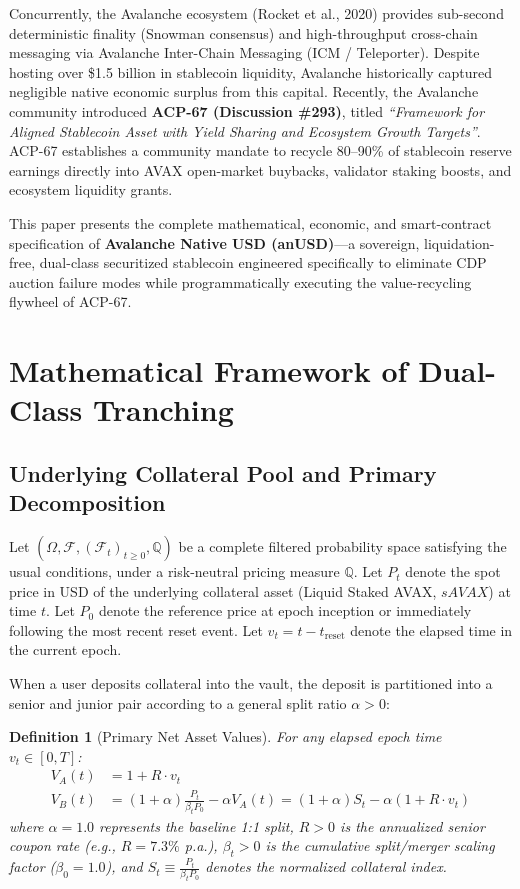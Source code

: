 \documentclass[11pt,a4paper]{article}
\newtheorem{definition}{Definition}
\begin{document}
Concurrently, the Avalanche ecosystem (Rocket et al., 2020) provides sub-second deterministic finality (Snowman consensus) and high-throughput cross-chain messaging via Avalanche Inter-Chain Messaging (ICM / Teleporter). Despite hosting over \$1.5 billion in stablecoin liquidity, Avalanche historically captured negligible native economic surplus from this capital. Recently, the Avalanche community introduced \textbf{ACP-67 (Discussion \#293)}, titled \textit{``Framework for Aligned Stablecoin Asset with Yield Sharing and Ecosystem Growth Targets''}. ACP-67 establishes a community mandate to recycle 80--90\% of stablecoin reserve earnings directly into AVAX open-market buybacks, validator staking boosts, and ecosystem liquidity grants.

This paper presents the complete mathematical, economic, and smart-contract specification of \textbf{Avalanche Native USD (anUSD)}---a sovereign, liquidation-free, dual-class securitized stablecoin engineered specifically to eliminate CDP auction failure modes while programmatically executing the value-recycling flywheel of ACP-67.

\section{Mathematical Framework of Dual-Class Tranching}

\subsection{Underlying Collateral Pool and Primary Decomposition}
Let $(\Omega, \mathcal{F}, (\mathcal{F}_t)_{t \ge 0}, \mathbb{Q})$ be a complete filtered probability space satisfying the usual conditions, under a risk-neutral pricing measure $\mathbb{Q}$. Let $P_t$ denote the spot price in USD of the underlying collateral asset (Liquid Staked AVAX, $sAVAX$) at time $t$. Let $P_0$ denote the reference price at epoch inception or immediately following the most recent reset event. Let $v_t = t - t_{\text{reset}}$ denote the elapsed time in the current epoch.

When a user deposits collateral into the vault, the deposit is partitioned into a senior and junior pair according to a general split ratio $\alpha > 0$:

\begin{definition}[Primary Net Asset Values]
For any elapsed epoch time $v_t \in [0, T]$:
\begin{align}
    V_A(t) &= 1 + R \cdot v_t \label{eq:va_def} \\
    V_B(t) &= (1 + \alpha) \frac{P_t}{\beta_t P_0} - \alpha V_A(t) = (1 + \alpha) S_t - \alpha (1 + R \cdot v_t) \label{eq:vb_def}
\end{align}
where $\alpha = 1.0$ represents the baseline 1:1 split, $R > 0$ is the annualized senior coupon rate (e.g., $R = 7.3\%$ p.a.), $\beta_t > 0$ is the cumulative split/merger scaling factor ($\beta_0 = 1.0$), and $S_t \equiv \frac{P_t}{\beta_t P_0}$ denotes the normalized collateral index.
\end{definition}
\end{document}
